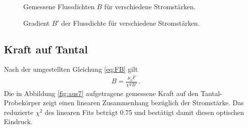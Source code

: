 \documentclass[12pt,a4paper,titlepage,headinclude,bibtotoc]{scrartcl}
\begin{document}
\begin{figure}[h]
\centering
{}
\caption{Gemessene Flussdichten $B$ für verschiedene Stromstärken.}
\label{fig:aus61}
\end{figure}
\begin{figure}[h]
\centering
{}
\caption{Gradient $B'$ der Flussdichte für verschiedene Stromstärken.}
\label{fig:aus62}
\end{figure}
\subsection{Kraft auf Tantal}
Nach der umgestellten Gleichung \eqref{eq:FB} gilt
\begin{align*}
	B=\frac{\mu_0F}{\chi VB'}\, .
\end{align*}
Die in Abbildung \ref{fig:aus7} aufgetragene gemessene Kraft auf den Tantal-Probekörper zeigt einen linearen Zusammenhang bezüglich der Stromstärke.
Das reduzierte $\chi^2$ des linearen Fits beträgt 0.75 und bestätigt damit diesen optischen Eindruck.
\end{document}
